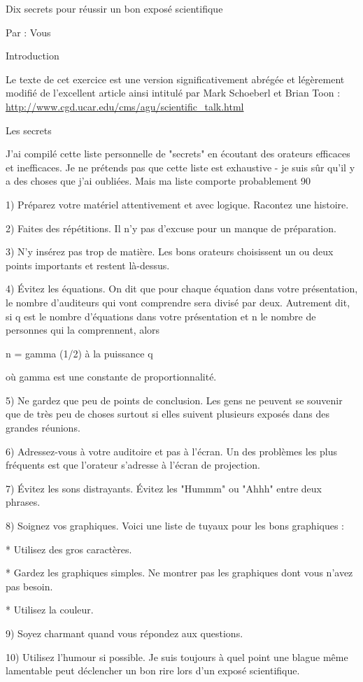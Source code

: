 \documentclass[12pt]{article}
\begin{document}
Dix secrets pour réussir un bon exposé scientifique

Par : Vous

Introduction

Le texte de cet exercice est une version significativement abrégée et légèrement modifié
de l'excellent article ainsi intitulé par Mark Schoeberl et Brian Toon :
\url{http://www.cgd.ucar.edu/cms/agu/scientific_talk.html}

Les secrets

J'ai compilé cette liste personnelle de "secrets" en écoutant des orateurs efficaces et inefficaces. Je ne prétends pas que cette liste est exhaustive - je suis sûr qu'il y a des choses que j'ai oubliées. Mais ma liste comporte probablement 90%

1) Préparez votre matériel attentivement et avec logique. Racontez une histoire.

2) Faites des répétitions. Il n'y pas d'excuse pour un manque de préparation.

3) N'y insérez pas trop de matière. Les bons orateurs choisissent un ou deux points importants et restent là-dessus.

4) Évitez les équations. On dit que pour chaque équation dans votre présentation, le nombre d'auditeurs qui vont comprendre sera divisé par deux. Autrement dit, si q est le nombre d'équations dans votre présentation et n le nombre de personnes qui la comprennent, alors 

n = gamma (1/2) à la puissance q

où gamma est une constante de proportionnalité.

5) Ne gardez que peu de points de conclusion. Les gens ne peuvent se souvenir que de très peu de choses surtout si elles suivent plusieurs exposés dans des grandes réunions.

6) Adressez-vous à votre auditoire et pas à l'écran. Un des problèmes les plus fréquents est que l'orateur s'adresse à l'écran de projection.

7) Évitez les sons distrayants. Évitez les "Hummm" ou "Ahhh" entre deux phrases.

8) Soignez vos graphiques. Voici une liste de tuyaux pour les bons graphiques :

* Utilisez des gros caractères.

* Gardez les graphiques simples. Ne montrer pas les graphiques dont vous n'avez pas besoin.

* Utilisez la couleur.

9) Soyez charmant quand vous répondez aux questions.

10) Utilisez l'humour si possible. Je suis toujours à quel point une blague même lamentable peut déclencher un bon rire lors d'un exposé scientifique.
\end{document}
